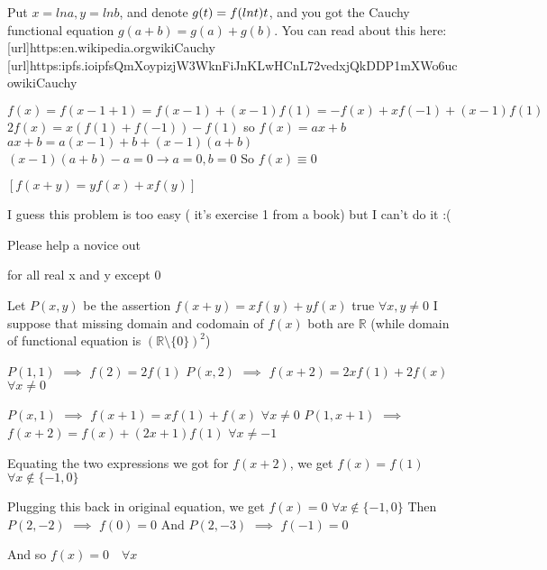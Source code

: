 \begin{solution}
	Put $x=lna, y=lnb$, and denote $g(t)=f(lnt)\/t$, and you got the Cauchy functional equation $g(a+b)=g(a)+g(b)$.
You can read about this here:
[url]https:\/\/en.wikipedia.org\/wiki\/Cauchy%
[url]https:\/\/ipfs.io\/ipfs\/QmXoypizjW3WknFiJnKLwHCnL72vedxjQkDDP1mXWo6uco\/wiki\/Cauchy%
\end{solution}



\begin{solution}
	$f(x)=f(x-1+1)=f(x-1)+(x-1)f(1)=-f(x)+xf(-1)+(x-1)f(1)$
$2f(x)=x(f(1)+f(-1))-f(1)$ so $f(x)=ax+b$
$ax+b=a(x-1)+b+(x-1)(a+b)$
$(x-1)(a+b)-a=0 \to a=0,b=0$
So $f(x) \equiv 0$
\end{solution}



\begin{solution}
	\begin{tcolorbox}$[f (x+y) = yf(x) + xf(y)]$

I guess this problem is too easy ( it's exercise 1 from a book) but I can't do it :(

Please help a novice out

for all real x and y except 0\end{tcolorbox}
Let $P(x,y)$ be the assertion $f(x+y)=xf(y)+yf(x)$ true $\forall x,y\ne 0$
I suppose that missing domain and codomain of $f(x)$ both are $\mathbb R$ (while domain of functional equation is $(\mathbb R\setminus\{0\})^2$)

$P(1,1)$ $\implies$ $f(2)=2f(1)$
$P(x,2)$ $\implies$ $f(x+2)=2xf(1)+2f(x)$ $\forall x\ne 0$

$P(x,1)$ $\implies$ $f(x+1)=xf(1)+f(x)$ $\forall x\ne 0$
$P(1,x+1)$ $\implies$ $f(x+2)=f(x)+(2x+1)f(1)$ $\forall x\ne -1$

Equating the two expressions we got for $f(x+2)$, we get $f(x)=f(1)$ $\forall x\notin\{-1,0\}$

Plugging this back in original equation, we get $f(x)=0$ $\forall x\notin\{-1,0\}$
Then $P(2,-2)$ $\implies$ $f(0)=0$
And $P(2,-3)$ $\implies$ $f(-1)=0$

And so $\boxed{f(x)=0\quad\forall x}$


\end{solution}



